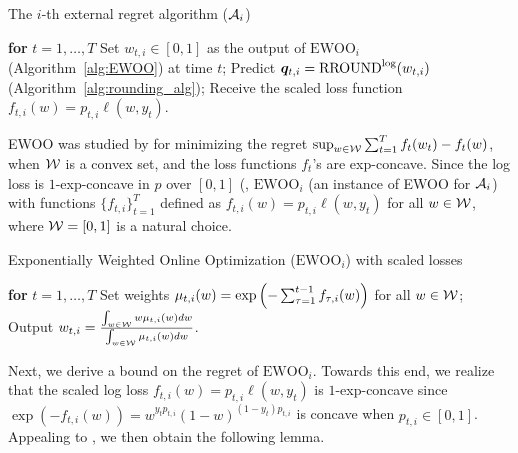 \begin{algorithm}[t]
                    \caption{The $i$-th external regret algorithm ($\mathcal{A}_{i}$)} 
                    \label{alg:A_i}
                    \begin{algorithmic}[1]
                            \STATE\textbf{for} $t = 1, \dots, T$                           
                            \STATE\hspace{3mm} Set $w_{t, i} \in [0,1]$ as the output of $\text{EWOO}_{i}$ (Algorithm~\ref{alg:EWOO}) at time $t$;
                            \STATE\hspace{3mm} Predict ${\bm{q}}_{t, i} = \text{RROUND}^{\text{log}}(w_{t, i})$ (Algorithm~\ref{alg:rounding_alg});
                            \STATE\hspace{3mm} Receive the scaled loss function $f_{t, i}(w) = p_{t, i} \ell(w, y_{t})$.
                        \end{algorithmic}
\end{algorithm}	
EWOO was studied by \cite{hazan2007logarithmic} for minimizing the regret $\sup_{w \in \mathcal{W}} \sum_{t = 1} ^ {T} f_{t}(w_{t}) - f_{t}(w)$, when $\mathcal{W}$ is a convex set, and the loss functions $f_{t}$'s are exp-concave. Since the log loss is $1$-exp-concave in $p$ over $[0, 1]$ (\cite[page 46]{cesa2006prediction}, $\text{EWOO}_{i}$ (an instance of EWOO for $\mathcal{A}_{i}$) with functions $\{f_{t, i}\}_{t = 1} ^ {T}$ defined as $f_{t, i}(w) = p_{t, i} \ell(w, y_{t})$ for all $w \in \mathcal{W}$, where $\mathcal{W} = [0, 1]$ is a natural choice. 

\begin{algorithm}[t]
                    \caption{Exponentially Weighted Online Optimization ($\text{EWOO}_{i}$) with scaled losses}
                    \label{alg:EWOO}
                    \begin{algorithmic}[1]
                            \STATE\textbf{for} $t = 1, \dots, T$
                            \STATE\hspace{3mm} Set weights $\mu_{t, i}(w) = \exp\left( -\sum_{\tau = 1} ^ {t - 1} f_{\tau, i}(w) \right)$ for all $w \in \mathcal{W}$;
                            \STATE\hspace{3mm} Output $w_{t, i} = \frac{\int_{w \in \mathcal{W}} w \mu_{t, i}(w) dw}{\int_{w \in \mathcal{W}} \mu_{t, i}(w) dw}$.
                        \end{algorithmic}
\end{algorithm}	

Next, we derive a bound on the regret of $\text{EWOO}_{i}$. Towards this end, we realize that the scaled log loss $f_{t, i}(w) = p_{t, i} \ell(w, y_{t})$ is $1$-exp-concave since $\exp(-f_{t,i}(w)) = w^{y_tp_{t,i}}(1-w)^{(1-y_t)p_{t,i}}$ is concave when $p_{t,i} \in [0,1]$. Appealing to \cite[Theorem 7]{hazan2007logarithmic}, we then obtain the following lemma.

